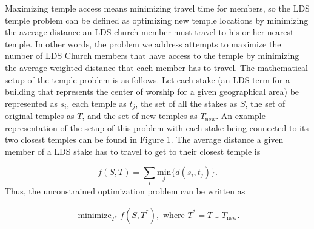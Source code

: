 \documentclass[twoside,twocolumn]{article}
\DeclareMathOperator*{\minimize}{minimize}
\begin{document}
Maximizing temple access means minimizing travel time for members, so the LDS temple problem can be defined as optimizing new temple locations by minimizing the average distance an LDS church member must travel to his or her nearest temple.
In other words, the problem we address attempts to maximize the number of LDS Church members that have access to the temple by minimizing the average weighted distance that each member has to travel.
The mathematical setup of the temple problem is as follows.
Let each stake (an LDS term for a building that represents the center of worship for a given geographical area) be represented as $s_i$, each temple as $t_j$, the set of all the stakes as $S$, the set of original temples as $T$, and the set of new temples as $T_{\text{new}}$.
An example representation of the setup of this problem with each stake being connected to its two closest temples can be found in Figure 1.
The average distance a given member of a LDS stake has to travel to get to their closest temple is

\begin{equation}
	f(S,T) = \sum_i \underset{j}{\text{min}}\{d(s_i,t_j)\}.
\end{equation}
Thus, the unconstrained optimization problem can be written as

\begin{equation}
\begin{aligned}
	\minimize_{T^*} f(S,T^*), \text{ where } T^* = T \cup T_{\text{new}}.
\end{aligned}
\end{equation}
\end{document}
